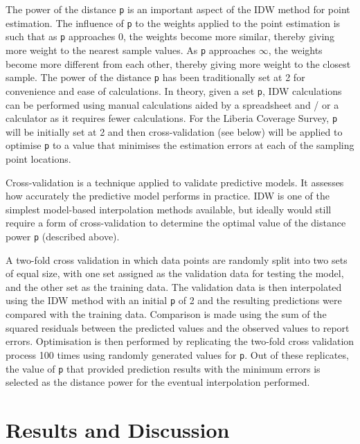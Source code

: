 \documentclass[12pt,a4paper]{article}
\begin{document}
\newpage

The power of the distance \texttt{p} is an important aspect of the IDW method for point estimation. The influence of \texttt{p} to the weights applied to the point estimation is such that as \texttt{p} approaches 0, the weights become more similar, thereby giving more weight to the nearest sample values. As \texttt{p} approaches \(\infty\), the weights become more different from each other, thereby giving more weight to the closest sample. The power of the distance \texttt{p} has been traditionally set at 2 for convenience and ease of calculations. In theory, given a set \texttt{p}, IDW calculations can be performed using manual calculations aided by a spreadsheet and / or a calculator as it requires fewer calculations. For the Liberia Coverage Survey, \texttt{p} will be initially set at 2 and then cross-validation (see below) will be applied to optimise \texttt{p} to a value that minimises the estimation errors at each of the sampling point locations.

Cross-validation is a technique applied to validate predictive models. It assesses how accurately the predictive model performs in practice. IDW is one of the simplest model-based interpolation methods available, but ideally would still require a form of cross-validation to determine the optimal value of the distance power \texttt{p} (described above).

A two-fold cross validation \citep{bivand2008applied} in which data points are randomly split into two sets of equal size, with one set assigned as the validation data for testing the model, and the other set as the training data. The validation data is then interpolated using the IDW method with an initial \texttt{p} of 2 and the resulting predictions were compared with the training data. Comparison is made using the sum of the squared residuals between the predicted values and the observed values to report errors. Optimisation is then performed by replicating the two-fold cross validation process 100 times using randomly generated values for \texttt{p}. Out of these replicates, the value of \texttt{p} that provided prediction results with the minimum errors is selected as the distance power for the eventual interpolation performed.

\hypertarget{results-and-discussion}{%
\section{Results and Discussion}\label{results-and-discussion}}
\end{document}
